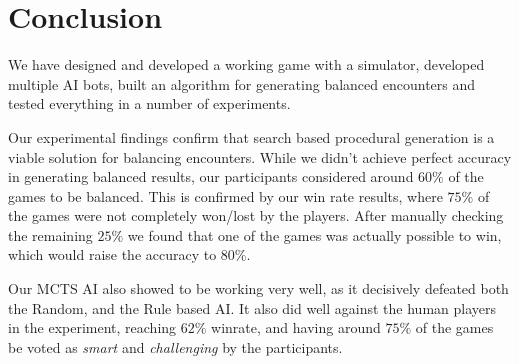 \chapter{Conclusion}
\label{chapter06}

We have designed and developed a working game with a simulator, developed multiple
AI bots, built an algorithm for generating balanced encounters and tested everything
in a number of experiments.

Our experimental findings confirm that search based procedural generation
is a viable solution for balancing encounters. While we didn't achieve perfect
accuracy in generating balanced results, our participants considered around $60\%$
of the games to be balanced. This is confirmed by our win rate results, where $75\%$
of the games were not completely won/lost by the players. After manually checking the remaining
$25\%$ we found that one of the games was actually possible to win, which would raise the accuracy
to $80\%$.

Our MCTS AI also showed to be working very well, as it decisively defeated both the Random, and the Rule based AI.
It also did well against the human players in the experiment, reaching $62\%$ winrate, and having around $75\%$ of the
games be voted as \emph{smart} and \emph{challenging} by the participants.